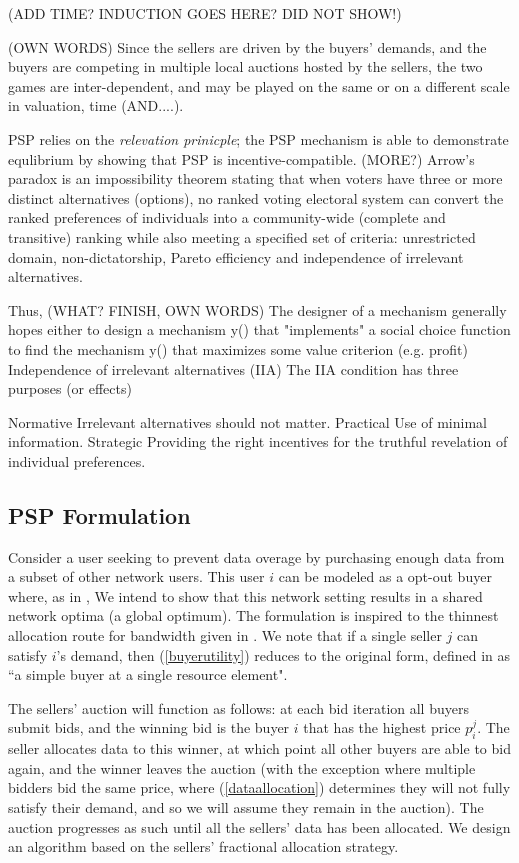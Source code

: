 \documentclass[12pt]{article}
\theoremstyle{definition}
\begin{document}
\begin{multicols}{2}
(ADD TIME? INDUCTION GOES HERE? DID NOT SHOW!)

(OWN
WORDS) Since the sellers are driven by the buyers' demands, and the buyers are
competing in multiple local auctions hosted by the sellers, the two games are
inter-dependent, and may be played on the same or on a different scale in
valuation, time (AND....). 


PSP relies on the \emph{relevation prinicple}; the
PSP mechanism is able to demonstrate equlibrium by showing that PSP is
incentive-compatible. (MORE?)
Arrow's paradox is an impossibility theorem stating that when voters have three
or more distinct alternatives (options), no ranked voting electoral system can
convert the ranked preferences of individuals into a community-wide (complete
and transitive) ranking while also meeting a specified set of criteria:
unrestricted domain, non-dictatorship, Pareto efficiency and independence of
irrelevant alternatives.

Thus, (WHAT? FINISH, OWN WORDS)
The designer of a mechanism generally hopes either to design a mechanism
y() that "implements" a social choice function to find the
mechanism y() that maximizes some value criterion (e.g. profit)
Independence of irrelevant alternatives (IIA)
The IIA condition has three purposes (or effects)

Normative
Irrelevant alternatives should not matter.
Practical
Use of minimal information.
Strategic
Providing the right incentives for the truthful revelation of individual
preferences. 

\subsection{PSP Formulation}
Consider a user seeking to prevent
data overage by purchasing enough data from a subset of other network users.
This user $i$ can be modeled as a opt-out buyer where, as in \cite{semret},
We intend to show that this network setting results in a shared network optima (a
global optimum). The formulation is inspired to the thinnest allocation route for
bandwidth given in \cite{lazar}. We note that if a single seller $j$ can
satisfy $i$'s demand, then
(\ref{buyerutility}) reduces to the original form, defined in
\cite{semret} as ``a simple buyer at a single resource element".

The sellers' auction will function as follows: at each bid iteration all buyers
submit bids, and the winning bid is the buyer $i$ that has the highest price
$p_i^j$. The seller allocates
data to this winner, at which point all other buyers are able to bid again, and
the winner leaves the auction (with the exception where multiple bidders bid
the same price, where (\ref{dataallocation}) determines they will not fully
satisfy their demand, and so we will assume they remain in the auction). The auction progresses as such until all the
sellers' data has been allocated. We design an algorithm based on the sellers'
fractional allocation strategy.


\end{multicols}
\end{document}
